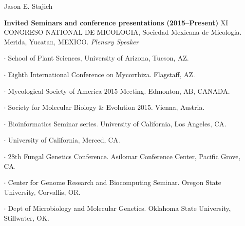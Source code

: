 \documentclass[10pt]{article}
\begin{document}
\begin{cv}{\centerline{Jason E. Stajich}}
\begin{cvlistcompact}{\bf Invited Seminars and conference presentations (2015--Present)}
  XI CONGRESO NATIONAL DE MICOLOGIA, Sociedad Mexicana de
  Micologia. Merida, Yucatan, MEXICO. {\it Plenary Speaker}
  \item $\cdot$ %
  School of Plant Sciences, University of Arizona, Tucson,
    AZ. 
  \item $\cdot$ %
    Eighth International Conference on Mycorrhiza.
    Flagstaff, AZ. 
  \item $\cdot$ %
    Mycological Society of America 2015 Meeting. Edmonton, AB, CANADA. 
  \item $\cdot$  %
    Society for Molecular Biology \& Evolution 2015. Vienna, Austria.
  \item $\cdot$  %
    Bioinformatics Seminar series. University of California, Los
    Angeles, CA.
  \item $\cdot$  %
    University of California, Merced, CA. 
  \item $\cdot$   %
    28th Fungal Genetics Conference. Asilomar Conference Center,
    Pacific Grove, CA. 
  \item $\cdot$ %
    Center for Genome Research and Biocomputing Seminar. Oregon
    State University, Corvallis, OR.
  \item $\cdot$ %
    Dept of Microbiology and Molecular Genetics. Oklahoma State University, Stillwater, OK. \\    

\end{cvlistcompact}
\end{cv}
\end{document}
